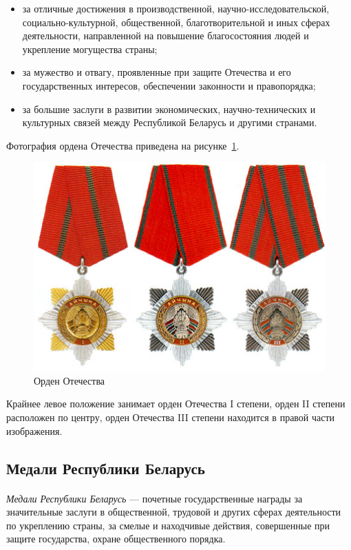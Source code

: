 \begin{itemize}
\item 
  за отличные достижения в производственной, научно-исследовательской,
  социально-культурной, общественной, благотворительной и иных сферах
  деятельности, направленной на повышение благосостояния людей и укрепление
  могущества страны;
\item
  за мужество и отвагу, проявленные при защите Отечества и его
  государственных интересов, обеспечении законности и правопорядка;
\item
  за большие заслуги в развитии экономических,
  научно-технических и культурных связей между Республикой Беларусь
  и другими странами.
\end{itemize}

Фотография ордена Отечества приведена на рисунке~\ref{fig:order_fatherland}.

\begin{figure}[h]
  \centering
  \includegraphics[width=150mm]{pic/order_fatherland.png}
  \caption{Орден Отечества}
  \label{fig:order_fatherland}
\end{figure}

Крайнее левое положение занимает орден Отечества I степени,
орден II степени расположен по центру, 
орден Отечества III степени находится в правой части изображения.


\subsection{Медали Республики Беларусь}

\paragraph{}
\textit{Медали Республики Беларусь} --- почетные государственные награды за
значительные заслуги в общественной, трудовой и других сферах деятельности
по укреплению страны, за смелые и находчивые действия,
совершенные при защите государства, охране общественного порядка.

